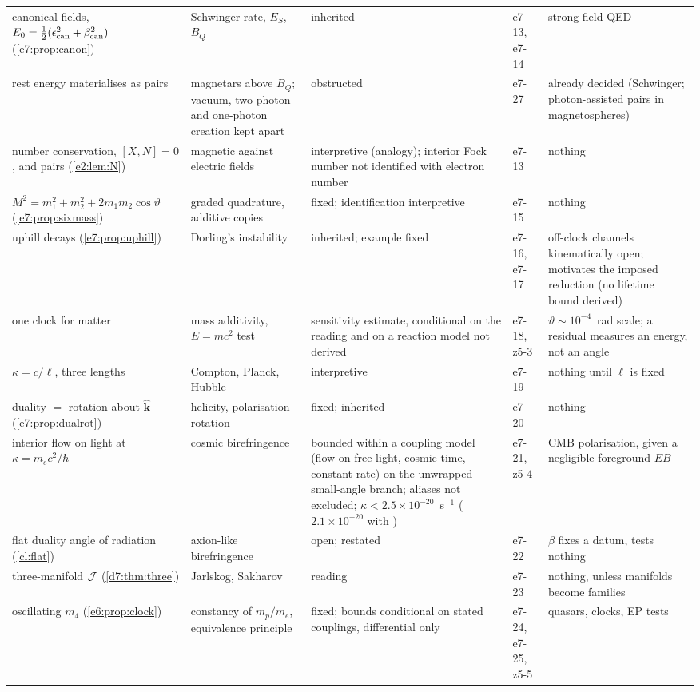 {\begin{longtable}{@{}>{\raggedright\arraybackslash}p{3.4cm}>{\raggedright\arraybackslash}p{3.2cm}>{\raggedright\arraybackslash}p{2.6cm}>{\raggedright\arraybackslash}p{1.5cm}>{\raggedright\arraybackslash}p{3.5cm}@{}}
canonical fields, $E_0=\tfrac12(\epsilon_{\rm can}^2+\beta_{\rm can}^2)$ (\cref{e7:prop:canon}) & Schwinger rate, $E_S$, $B_Q$ & inherited & e7-13, e7-14 & strong-field QED\\
rest energy materialises as pairs & magnetars above $B_Q$; vacuum, two-photon and one-photon creation kept apart & obstructed & e7-27 & already decided (Schwinger; photon-assisted pairs in magnetospheres)\\
number conservation, $[X,N]=0$, and pairs (\cref{e2:lem:N}) & magnetic against electric fields & interpretive (analogy); interior Fock number not identified with electron number & e7-13 & nothing\\
$M^2=m_1^2+m_2^2+2m_1m_2\cos\vartheta$ (\cref{e7:prop:sixmass}) & graded quadrature, additive copies & fixed; identification interpretive & e7-15 & nothing\\
uphill decays (\cref{e7:prop:uphill}) & Dorling's instability & inherited; example fixed & e7-16, e7-17 & off-clock channels kinematically open; motivates the imposed reduction (no lifetime bound derived)\\
one clock for matter & mass additivity, $E=mc^2$ test & sensitivity estimate, conditional on the reading and on a reaction model not derived & e7-18, z5-3 & $\vartheta\sim10^{-4}$~rad scale; a residual measures an energy, not an angle\\
$\kappa=c/\ell$, three lengths & Compton, Planck, Hubble & interpretive & e7-19 & nothing until $\ell$ is fixed\\
duality $=$ rotation about $\hat{\mathbf k}$ (\cref{e7:prop:dualrot}) & helicity, polarisation rotation & fixed; inherited & e7-20 & nothing\\
interior flow on light at $\kappa=m_ec^2/\hbar$ & cosmic birefringence & bounded within a coupling model (flow on free light, cosmic time, constant rate) on the unwrapped small-angle branch; aliases not excluded; $\kappa<2.5\times10^{-20}$~s$^{-1}$ ($2.1\times10^{-20}$ with \cite{EskiltKomatsu22}) & e7-21, z5-4 & CMB polarisation, given a negligible foreground $EB$\\
flat duality angle of radiation (\cref{cl:flat}) & axion-like birefringence & open; restated & e7-22 & $\beta$ fixes a datum, tests nothing\\
three-manifold $\mathcal J$ (\cref{d7:thm:three}) & Jarlskog, Sakharov & reading & e7-23 & nothing, unless manifolds become families\\
oscillating $m_4$ (\cref{e6:prop:clock}) & constancy of $m_p/m_e$, equivalence principle & fixed; bounds conditional on stated couplings, differential only & e7-24, e7-25, z5-5 & quasars, clocks, EP tests\\
\end{longtable}}

